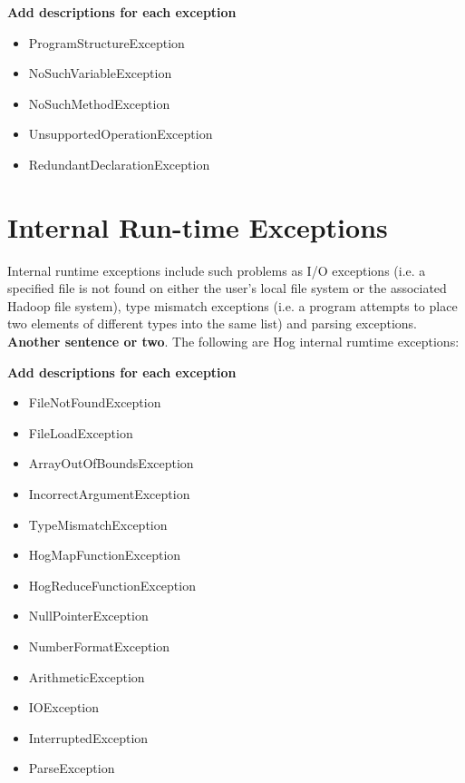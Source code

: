 \documentclass{book}
\begin{document}
\textbf{Add descriptions for each exception}

\begin{itemize}
  \item[] ProgramStructureException
  \item[] NoSuchVariableException
  \item[] NoSuchMethodException
  \item[] UnsupportedOperationException
  \item[] RedundantDeclarationException
\end{itemize}


\section{Internal Run-time Exceptions} %
\label{sec:internal_run_time_exceptions}

Internal run­time exceptions include such problems as I/O exceptions (i.e. a
specified file is not found on either the user’s local file system or the
associated Hadoop file system), type mismatch exceptions (i.e. a program attempts
to place two elements of different types into the same list) and parsing
exceptions. \textbf{Another sentence or two}. The following are Hog internal
rum­time exceptions:

\textbf{Add descriptions for each exception}

\begin{itemize}
  \item[] FileNotFoundException
  \item[] FileLoadException
  \item[] ArrayOutOfBoundsException
  \item[] IncorrectArgumentException
  \item[] TypeMismatchException
  \item[] HogMapFunctionException
  \item[] HogReduceFunctionException
  \item[] NullPointerException
  \item[] NumberFormatException
  \item[] ArithmeticException
  \item[] IOException
  \item[] InterruptedException
  \item[] ParseException
\end{itemize}

\end{document}

